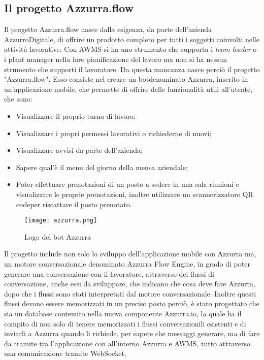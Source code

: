 \subsection{Il progetto Azzurra.flow}

Il progetto Azzurra.flow nasce dalla esigenza, da parte dell'azienda AzzurroDigitale, di offrire un prodotto completo per tutti i soggetti coinvolti nelle attività lavorative. Con \gls{AWMS} si ha uno strumento che supporta i \emph{team leader} o i \gls{plant manager}\ap{[g]} nella loro pianificazione del lavoro ma non si ha nessun strumento che supporti il lavoratore. Da questa mancanza nasce perciò il progetto "Azzurra.flow". Esso consiste nel creare un \gls{bot}\glsfirstoccur denominato Azzurra, inserito in un’applicazione mobile, che permette di offrire delle funzionalità utili all'utente, che sono:
\begin{itemize}
	\item Visualizzare il proprio turno di lavoro;
	\item Visualizzare i propri permessi lavorativi o richiederne di nuovi;
	\item Visualizzare avvisi da parte dell'azienda;
	\item Sapere qual'è il menu del giorno della mensa aziendale;
	\item Poter effettuare prenotazioni di un posto a sedere in una sala riunioni e visualizzare le proprie prenotazioni, inoltre utilizzare un scannerizzatore \gls{QR code}\glsfirstoccur per riscattare il posto prenotato.
\end{itemize}
\begin{figure}[!h] 
	\begin{center}
		\texttt{[image: azzurra.png]}
		\caption{Logo del bot Azzurra}
	\end{center}
\end{figure}
Il progetto include non solo lo sviluppo dell'applicazione mobile con Azzurra ma, un motore conversazionale denominato Azzurra Flow Engine, in grado di poter generare una conversazione con il lavoratore, attraverso dei flussi di conversazione, anche essi da sviluppare, che indicano che cosa deve fare Azzurra, dopo che i flussi sono stati interpretati dal motore conversazionale. Inoltre questi flussi devono essere memorizzati in un preciso posto perciò, è stato progettato che sia un database contenuto nella nuova componente Azzurra.io, la quale ha il compito di non solo di tenere memorizzati i flussi conversazionili esistenti e di inviarli a Azzurra quando li richiede, per sapere che messaggi generare, ma di fare da tramite tra l'applicazione con all'interno Azzurra e \gls{AWMS}, tutto attraverso una comunicazione tramite \gls{WebSocket}\glsfirstoccur.
